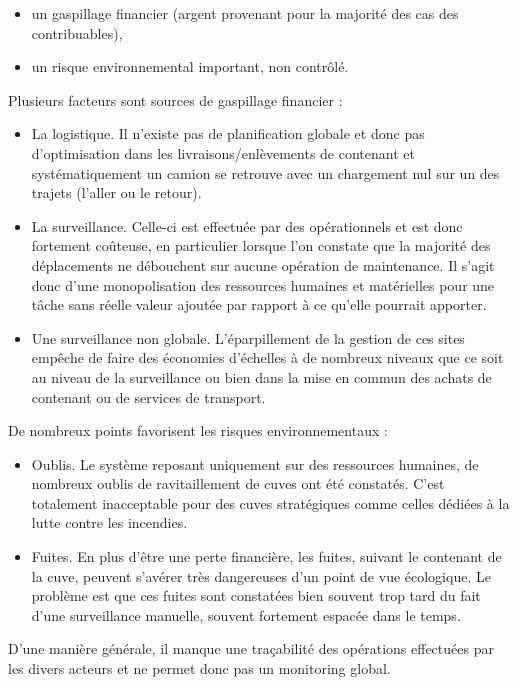 \documentclass[a4paper]{article}
\begin{document}
\begin{itemize}
\item un gaspillage financier (argent provenant pour la majorité des cas des contribuables),
\item un risque environnemental important, non contrôlé.
\end{itemize}

Plusieurs facteurs sont sources de gaspillage financier :

\begin{itemize}
\item La logistique. Il n'existe pas de planification globale et donc pas d'optimisation dans les livraisons/enlèvements de contenant et systématiquement un camion se retrouve avec un chargement nul sur un des trajets (l'aller ou le retour).
\item La surveillance. Celle-ci est effectuée par des opérationnels et est donc fortement coûteuse, en particulier lorsque l'on constate que la majorité des déplacements ne débouchent sur aucune opération de maintenance. Il s'agit donc d'une monopolisation des ressources humaines et matérielles pour une tâche sans réelle valeur ajoutée par rapport à ce qu'elle pourrait apporter.
\item Une surveillance non globale. L'éparpillement de la gestion de ces sites empêche de faire des économies d'échelles à de nombreux niveaux que ce soit au niveau de la surveillance ou bien dans la mise en commun des achats de contenant ou de services de transport.
\end{itemize}

De nombreux points favorisent les risques environnementaux :

\begin{itemize}
\item Oublis. Le système reposant uniquement sur des ressources humaines, de nombreux oublis de ravitaillement de cuves ont été constatés. C'est totalement inacceptable pour des cuves stratégiques comme celles dédiées à la lutte contre les incendies.
\item Fuites. En plus d'être une perte financière, les fuites, suivant le contenant de la cuve, peuvent s'avérer très dangereuses d'un point de vue écologique. Le problème est que ces fuites sont constatées bien souvent trop tard du fait d'une surveillance manuelle, souvent fortement espacée dans le temps.
\end{itemize}

D'une manière générale, il manque une traçabilité des opérations effectuées par les divers acteurs et ne permet donc pas un monitoring global.
\end{document}
